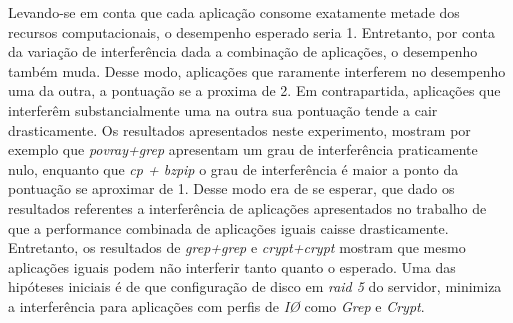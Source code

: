 Levando-se em conta que cada aplicação consome exatamente metade dos recursos computacionais, o desempenho esperado seria 1. Entretanto, por conta da variação de interferência dada a combinação de aplicações, o desempenho também muda. Desse modo, aplicações que raramente interferem no desempenho uma da outra, a pontuação se a proxima de 2. Em contrapartida, aplicações que interferêm substancialmente uma na outra sua pontuação tende a cair drasticamente. Os resultados apresentados neste experimento, mostram por exemplo que \textit{povray+grep} apresentam um grau de interferência praticamente nulo, enquanto que \textit{cp + bzpip} o grau de interferência é maior a ponto da pontuação se aproximar de 1. Desse modo era de se esperar, que dado os resultados referentes a interferência de aplicações apresentados no trabalho de  que a performance combinada de aplicações iguais caisse drasticamente. Entretanto, os resultados de \textit{grep+grep} e \textit{crypt+crypt} mostram que mesmo aplicações iguais podem não interferir tanto quanto o esperado. Uma das hipóteses iniciais é de que configuração de disco em \textit{raid 5} do servidor, minimiza a interferência para aplicações com perfis de \textit{I\O} como \textit{Grep} e \textit{Crypt}.


